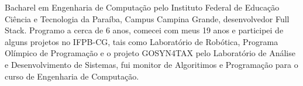 \begin{cvletter}
  Bacharel em Engenharia de Computação pelo Instituto Federal de Educação Ciência e
  Tecnologia da Paraíba, Campus Campina Grande, desenvolvedor Full Stack. Programo a 
  cerca de 6 anos, comecei com meus 19 anos e participei de alguns projetos 
  no IFPB-CG, tais como Laboratório de Robótica, Programa Olímpico de Programação e o 
  projeto GOSYN4TAX pelo Laboratório de Análise e Desenvolvimento de Sistemas, fui monitor de
  Algoritimos e Programação para o curso de Engenharia de Computação.

\end{cvletter}